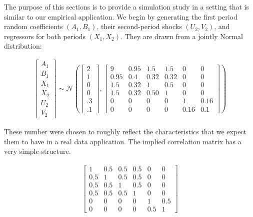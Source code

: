 The purpose of this sections is to provide a simulation study in a setting that is similar to our empirical application. We begin by generating the first period random coefficients $(A_1, B_1)$, their second-period shocks $(U_2, V_2)$,
and regressors for both periods $(X_1, X_2)$. They are drawn from a jointly Normal distribution:

\begin{align} \label{eq:simulation_model}
\begin{bmatrix}
  A_1\\
  B_1\\
  X_1\\
  X_2\\
  U_2\\
  V_2 
\end{bmatrix}
\sim
\mathcal{N}\left(
\begin{bmatrix}
2 \\ 
1 \\ 
0 \\ 
0 \\ 
.3 \\
.1 
\end{bmatrix}
,
\begin{bmatrix}
  9 & 0.95 & 1.5 & 1.5 & 0 & 0 \\
  0.95 & 0.4 & 0.32 & 0.32 & 0 & 0 \\
  1.5 & 0.32 & 1 & 0.5 & 0 & 0 \\
  1.5 & 0.32 & 0.50 & 1 & 0 & 0 \\ 
  0 & 0 & 0 & 0 & 1 & 0.16 \\
  0 & 0 & 0 & 0 & 0.16 & 0.1 
\end{bmatrix}
\right)
\end{align}

These number were chosen to roughly reflect the characteristics that we expect them to have in a real data
application. The implied correlation matrix has a very simple structure.

\begin{align}  \label{eq:simulation_correlation}
  \begin{bmatrix}
      1&  0.5& 0.5&  0.5&  0&  0 \\
      0.5&  1& 0.5&  0.5&  0&  0 \\
      0.5& 0.5&  1&  0.5&  0&  0 \\
      0.5& 0.5& 0.5&   1&  0&  0 \\
      0&   0&  0&   0&  1& 0.5 \\
      0&   0&  0&   0& 0.5&  1
  \end{bmatrix}  
\end{align}

